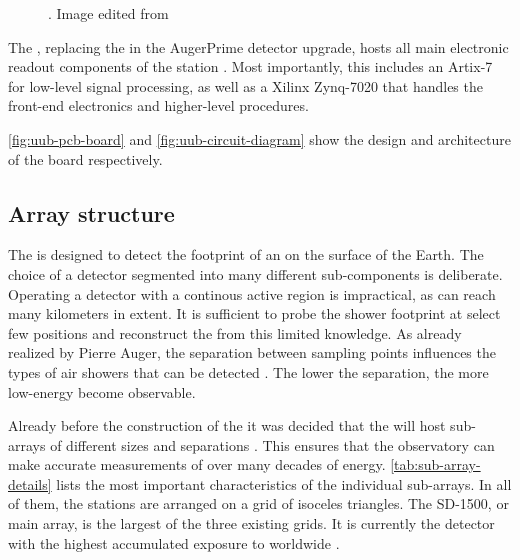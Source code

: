 \begin{figure}[t]
  \centering
  \hspace{0.2cm}
  \caption[]{ . Image edited from \cite{nitzNewElectronicsSurface2021}  }
  \label{fig:uub-specifications}
\end{figure}

The \UUB, replacing the \UB in the AugerPrime detector upgrade, hosts all main 
electronic readout components of the station 
\cite{collaborationPierreAugerObservatory2016}. Most importantly, this includes 
an Artix-7 \FPGA \cite{xilinx7SeriesFPGAs2020} for low-level signal processing,
as well as a Xilinx Zynq-7020 \SOC \cite{amdZynq7000SoC2023} that handles the 
front-end electronics and higher-level procedures.

\cref{fig:uub-pcb-board} and \cref{fig:uub-circuit-diagram} show the design and
architecture of the \UUB \PCB board respectively.


\subsection{Array structure}
\label{ssec:array-structure}

The \SD is designed to detect the footprint of an \EAS on the surface of the 
Earth. The choice of a detector segmented into many different sub-components is
deliberate. Operating a detector with a continous active region is impractical, 
as \EASs can reach many kilometers in extent. It is sufficient to probe the 
shower footprint at select few positions and reconstruct the \EAS from this 
limited knowledge. As already realized by Pierre Auger, the separation between 
sampling points influences the types of air showers that can be detected 
. The lower the separation, the more low-energy \EAS become 
observable.

Already before the construction of the \PAO it was decided that the \SD will 
host sub-arrays of different sizes and separations 
\cite{watsonDevelopmentPierreAuger}. This ensures that the observatory can 
make accurate measurements of \EAS over many decades of energy. 
\cref{tab:sub-array-details} lists the most important characteristics of the 
individual sub-arrays. In all of them, the stations are arranged on a grid of 
isoceles triangles. The SD-1500, or main array, is the largest of the three 
existing grids. It is currently the detector with the highest accumulated 
exposure to \CRs worldwide \cite{aabPierreAugerObservatory2020}.

